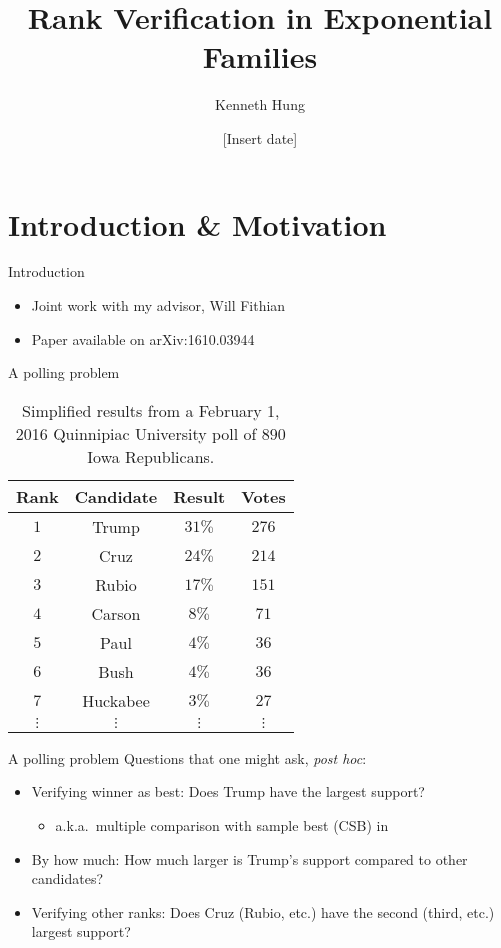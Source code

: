 \documentclass{beamer}
\title[Verifying Winner]{Rank Verification in Exponential Families}
\author[Kenneth Hung]{Kenneth Hung}
\institute[UC Berkeley]{
University of California, Berkeley \\
\medskip
\textit{kenhung@berkeley.edu}
}
\date{[Insert date]}
\begin{document}
\begin{frame}
\titlepage
\end{frame}

\section{Introduction \& Motivation}

\begin{frame}{Introduction}
\begin{itemize}
\item Joint work with my advisor, Will Fithian
\item Paper available on arXiv:1610.03944
\end{itemize}
\end{frame}

\begin{frame}{A polling problem}
\begin{table}[htbp]
\centering
\begin{tabular}{c c c c}
	\hline
	Rank & Candidate & Result & Votes \\
	\hline
	$1$ & Trump & $31\%$ & $276$ \\
	$2$ & Cruz & $24\%$ & $214$ \\
	$3$ & Rubio & $17\%$ & $151$ \\
	$4$ & Carson & $8\%$ & $71$ \\
	$5$ & Paul & $4\%$ & $36$ \\
	$6$ & Bush & $4\%$ & $36$ \\
	$7$ & Huckabee & $3\%$ & $27$ \\
	$\vdots$ & $\vdots$ & $\vdots $ & $\vdots$ \\
	\hline
\end{tabular}
\caption{Simplified results from a February 1, 2016 Quinnipiac University poll of $890$ Iowa Republicans.}
\label{tbl:poll}
\end{table}
\end{frame}

\begin{frame}{A polling problem}
Questions that one might ask, {\it post hoc}:
\begin{itemize}
\item Verifying winner as best: Does Trump have the largest support?
\begin{itemize}
\item a.k.a.\ multiple comparison with sample best (CSB) in \citet{Stefansson:1988wj}
\end{itemize}
\item By how much: How much larger is Trump's support compared to other candidates?
\item Verifying other ranks: Does Cruz (Rubio, etc.) have the second (third, etc.) largest support?
\end{itemize}
\end{frame}
\end{document}
